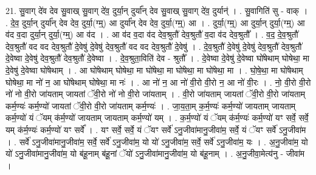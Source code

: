 \documentclass[17pt]{extarticle}
\begin{document}
21. सु॒वाग् दे॑व देव सु॒वाख् सु॒वाग् दे॑व॒ दुर्या॒न् दुर्या᳚न् देव सु॒वाख् सु॒वाग् दे॑व॒ दुर्यान्॑ । . सु॒वागिति॑ सु - वाक् । . दे॒व॒ दुर्या॒न् दुर्या᳚न् देव देव॒ दुर्या॒(ग्म्॒) आ दुर्या᳚न् देव देव॒ दुर्या॒(ग्म्॒) आ । . दुर्या॒(ग्म्॒) आ दुर्या॒न् दुर्या॒(ग्म्॒) आ व॑द व॒दा दुर्या॒न् दुर्या॒(ग्म्॒) आ व॑द । . आ व॑द व॒दा व॑द देव॒श्रुतौ॑ देव॒श्रुतौ॑ व॒दा व॑द देव॒श्रुतौ᳚ । . व॒द॒ दे॒व॒श्रुतौ॑ देव॒श्रुतौ॑ वद वद देव॒श्रुतौ॑ दे॒वेषु॑ दे॒वेषु॑ देव॒श्रुतौ॑ वद वद देव॒श्रुतौ॑ दे॒वेषु॑ । . दे॒व॒श्रुतौ॑ दे॒वेषु॑ दे॒वेषु॑ देव॒श्रुतौ॑ देव॒श्रुतौ॑ दे॒वेष्वा दे॒वेषु॑ देव॒श्रुतौ॑ देव॒श्रुतौ॑ दे॒वेष्वा । . दे॒व॒श्रुता॒विति॑ देव - श्रुतौ᳚ । . दे॒वेष्वा दे॒वेषु॑ दे॒वेष्वा घो॑षेथाम् घोषेथा॒ मा दे॒वेषु॑ दे॒वेष्वा घो॑षेथाम् । . आ घो॑षेथाम् घोषेथा॒ मा घो॑षेथा॒ मा घो॑षेथा॒ मा घो॑षेथा॒ मा । . घो॒षे॒था॒ मा घो॑षेथाम् घोषेथा॒ मा नो॑ न॒ आ घो॑षेथाम् घोषेथा॒ मा नः॑ । . आ नो॑ न॒ आ नो॑ वी॒रो वी॒रो न॒ आ नो॑ वी॒रः । . नो॒ वी॒रो वी॒रो नो॑ नो वी॒रो जा॑यताम् जायतां ॅवी॒रो नो॑ नो वी॒रो जा॑यताम् । . वी॒रो जा॑यताम् जायतां ॅवी॒रो वी॒रो जा॑यताम् कर्म॒ण्यः॑ कर्म॒ण्यो॑ जायतां ॅवी॒रो वी॒रो जा॑यताम् कर्म॒ण्यः॑ । . जा॒य॒ता॒म् क॒र्म॒ण्यः॑ कर्म॒ण्यो॑ जायताम् जायताम् कर्म॒ण्यो॑ यं ॅयम् क॑र्म॒ण्यो॑ जायताम् जायताम् कर्म॒ण्यो॑ यम् । . क॒र्म॒ण्यो॑ यं ॅयम् क॑र्म॒ण्यः॑ कर्म॒ण्यो॑ यꣳ सर्वे॒ सर्वे॒ यम् क॑र्म॒ण्यः॑ कर्म॒ण्यो॑ यꣳ सर्वे᳚ । . यꣳ सर्वे॒ सर्वे॒ यं ॅयꣳ सर्वे॑ ऽनु॒जीवा॑मानु॒जीवा॑म॒ सर्वे॒ यं ॅयꣳ सर्वे॑ ऽनु॒जीवा॑म । . सर्वे॑ ऽनु॒जीवा॑मानु॒जीवा॑म॒ सर्वे॒ सर्वे॑ ऽनु॒जीवा॑म॒ यो यो॑ ऽनु॒जीवा॑म॒ सर्वे॒ सर्वे॑ ऽनु॒जीवा॑म॒ यः । . अ॒नु॒जीवा॑म॒ यो यो॑ ऽनु॒जीवा॑मानु॒जीवा॑म॒ यो ब॑हू॒नाम् ब॑हू॒नां ॅयो॑ ऽनु॒जीवा॑मानु॒जीवा॑म॒ यो ब॑हू॒नाम् । . अ॒नु॒जीवा॒मेत्य॑नु - जीवा॑म । \newline
\end{document}
